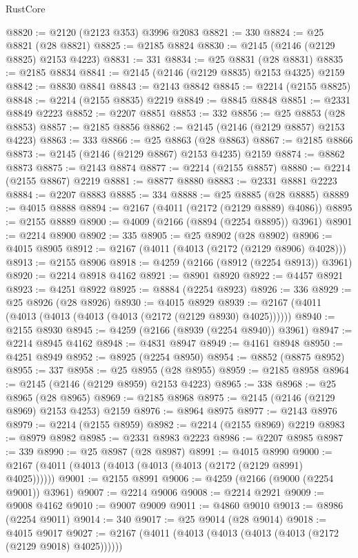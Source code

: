 \begin{lexlean}{RustCore}
\begin{coremodule}
@8820 := @2120 (@2123 @353) @3996 @2083
@8821 := 330
@8824 := @25 @8821 (@28 @8821)
@8825 := @2185 @8824
@8830 := @2145 (@2146 (@2129 @8825) @2153 @4223)
@8831 := 331
@8834 := @25 @8831 (@28 @8831)
@8835 := @2185 @8834
@8841 := @2145 (@2146 (@2129 @8835) @2153 @4325) @2159
@8842 := @8830 @8841
@8843 := @2143 @8842
@8845 := @2214 (@2155 @8825)
@8848 := @2214 (@2155 @8835) @2219
@8849 := @8845 @8848
@8851 := @2331 @8849 @2223
@8852 := @2207 @8851
@8853 := 332
@8856 := @25 @8853 (@28 @8853)
@8857 := @2185 @8856
@8862 := @2145 (@2146 (@2129 @8857) @2153 @4223)
@8863 := 333
@8866 := @25 @8863 (@28 @8863)
@8867 := @2185 @8866
@8873 := @2145 (@2146 (@2129 @8867) @2153 @4235) @2159
@8874 := @8862 @8873
@8875 := @2143 @8874
@8877 := @2214 (@2155 @8857)
@8880 := @2214 (@2155 @8867) @2219
@8881 := @8877 @8880
@8883 := @2331 @8881 @2223
@8884 := @2207 @8883
@8885 := 334
@8888 := @25 @8885 (@28 @8885)
@8889 := @4015 @8888
@8894 := @2167 (@4011 (@2172 (@2129 @8889) @4086))
@8895 := @2155 @8889
@8900 := @4009 (@2166 (@8894 (@2254 @8895)) @3961)
@8901 := @2214 @8900
@8902 := 335
@8905 := @25 @8902 (@28 @8902)
@8906 := @4015 @8905
@8912 := @2167 (@4011 (@4013 (@2172 (@2129 @8906) @4028)))
@8913 := @2155 @8906
@8918 := @4259 (@2166 (@8912 (@2254 @8913)) @3961)
@8920 := @2214 @8918 @4162
@8921 := @8901 @8920
@8922 := @4457 @8921
@8923 := @4251 @8922
@8925 := @8884 (@2254 @8923)
@8926 := 336
@8929 := @25 @8926 (@28 @8926)
@8930 := @4015 @8929
@8939 := @2167 (@4011 (@4013 (@4013 (@4013 (@4013 (@2172 (@2129 @8930) @4025))))))
@8940 := @2155 @8930
@8945 := @4259 (@2166 (@8939 (@2254 @8940)) @3961)
@8947 := @2214 @8945 @4162
@8948 := @4831 @8947
@8949 := @4161 @8948
@8950 := @4251 @8949
@8952 := @8925 (@2254 @8950)
@8954 := @8852 (@8875 @8952)
@8955 := 337
@8958 := @25 @8955 (@28 @8955)
@8959 := @2185 @8958
@8964 := @2145 (@2146 (@2129 @8959) @2153 @4223)
@8965 := 338
@8968 := @25 @8965 (@28 @8965)
@8969 := @2185 @8968
@8975 := @2145 (@2146 (@2129 @8969) @2153 @4253) @2159
@8976 := @8964 @8975
@8977 := @2143 @8976
@8979 := @2214 (@2155 @8959)
@8982 := @2214 (@2155 @8969) @2219
@8983 := @8979 @8982
@8985 := @2331 @8983 @2223
@8986 := @2207 @8985
@8987 := 339
@8990 := @25 @8987 (@28 @8987)
@8991 := @4015 @8990
@9000 := @2167 (@4011 (@4013 (@4013 (@4013 (@4013 (@2172 (@2129 @8991) @4025))))))
@9001 := @2155 @8991
@9006 := @4259 (@2166 (@9000 (@2254 @9001)) @3961)
@9007 := @2214 @9006
@9008 := @2214 @2921
@9009 := @9008 @4162
@9010 := @9007 @9009
@9011 := @4860 @9010
@9013 := @8986 (@2254 @9011)
@9014 := 340
@9017 := @25 @9014 (@28 @9014)
@9018 := @4015 @9017
@9027 := @2167 (@4011 (@4013 (@4013 (@4013 (@4013 (@2172 (@2129 @9018) @4025))))))

\end{coremodule}
\end{lexlean}
